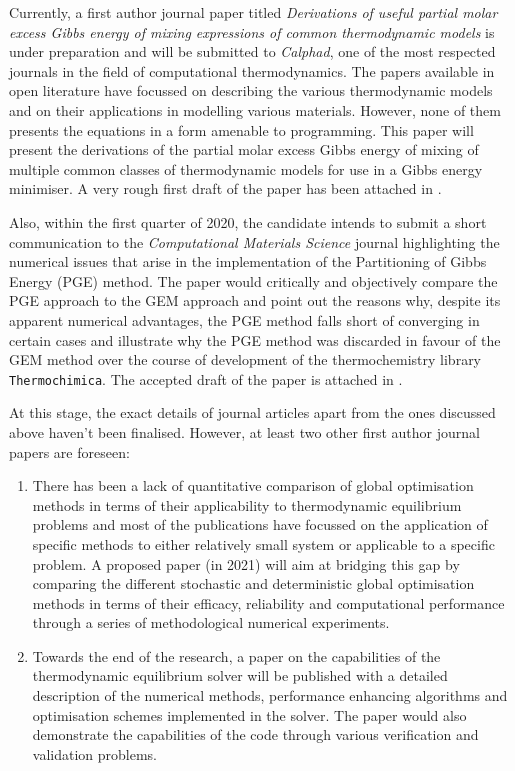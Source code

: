 	Currently, a first author journal paper titled \emph{Derivations of useful partial molar excess Gibbs energy of mixing expressions of common thermodynamic models} is under preparation and will be submitted to  \emph{Calphad}, one of the most respected journals in the field of computational thermodynamics. The papers available in open literature have focussed on describing the various thermodynamic models and on their applications in modelling various materials. However, none of them presents the equations in a form amenable to programming. This paper will present the derivations of the partial molar excess Gibbs energy of mixing of multiple common classes of thermodynamic models for use in a Gibbs energy minimiser. A very rough first draft of the paper has been attached in .

	Also, within the first quarter of 2020, the candidate intends to submit a short communication to the \emph{Computational Materials Science} journal highlighting the numerical issues that arise in the implementation of the Partitioning of Gibbs Energy (PGE) method. The paper would critically and objectively compare the PGE approach to the GEM approach and point out the reasons why, despite its apparent numerical advantages, the PGE method falls short of converging in certain cases and illustrate why the PGE method was discarded in favour of the GEM method over the course of development of the thermochemistry library \texttt{Thermochimica}. The accepted draft of the paper is attached in .

	At this stage, the exact details of journal articles apart from the ones discussed above haven't been finalised. However, at least two other first author journal papers are foreseen:
	\begin{enumerate}
	\item There has been a lack of quantitative comparison of global optimisation methods in terms of their applicability to thermodynamic equilibrium problems and most of the publications have focussed on the application of specific methods to  either relatively small system or applicable to a specific problem. A proposed paper (in 2021) will aim at bridging this gap by comparing the different stochastic and deterministic global optimisation methods in terms of their efficacy, reliability and computational performance through a series of methodological numerical experiments.
	\item Towards the end of the research, a paper on the capabilities of the thermodynamic equilibrium  solver will be published with a detailed description of the numerical methods, performance enhancing algorithms and optimisation schemes implemented in the solver. The paper would also demonstrate the capabilities of the code through various verification and validation problems.
	\end{enumerate}

